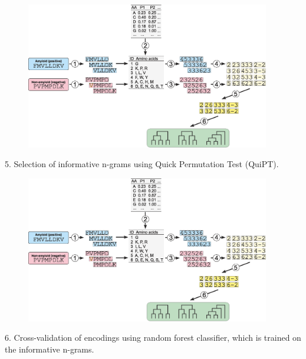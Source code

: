 \documentclass{beamer}\usepackage[]{graphicx}\usepackage[]{color}
\begin{document}
  \begin{frame}{}
\begin{figure} 
\includegraphics[width=0.95\textwidth]{static_figure/scheme.eps}
\end{figure}

5. Selection of informative n-grams using Quick Permutation Test (QuiPT).
\end{frame}

  \begin{frame}{}
\begin{figure} 
\includegraphics[width=0.95\textwidth]{static_figure/scheme.eps}
\end{figure}

6. Cross-validation of encodings using random forest classifier, which is trained on the informative n-grams.
\end{frame}


% 
  
\end{document}
